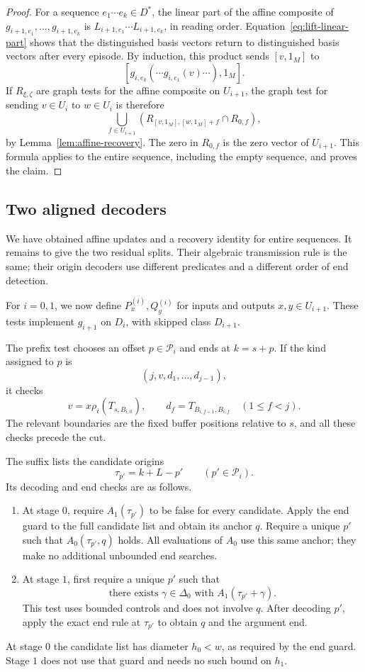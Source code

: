 \begin{proof}
For a sequence $e_1\cdots e_k\in D^*$, the linear part of the affine
composite of $g_{i+1,e_1},\ldots,g_{i+1,e_k}$ is
$L_{i+1,e_1}\cdots L_{i+1,e_k}$, in reading order.
Equation~\eqref{eq:lift-linear-part} shows that the distinguished basis
vectors return to distinguished basis vectors after every episode.
By induction, this product sends $[v,1_M]$ to
\[
 [g_{i,e_k}(\cdots g_{i,e_1}(v)\cdots),1_M].
\]
If $R_{\xi,\zeta}$ are graph tests for the affine composite on
$U_{i+1}$, the graph test for sending $v\in U_i$ to $w\in U_i$ is
therefore
\[
 \bigcup_{f\in U_{i+1}}
 \left(R_{[v,1_M],[w,1_M]+f}\cap R_{0,f}\right),
\]
by Lemma~\ref{lem:affine-recovery}.  The zero in $R_{0,f}$ is the
zero vector of $U_{i+1}$.  This formula applies to the entire sequence,
including the empty sequence, and proves the claim.
\end{proof}

\subsection{Two aligned decoders}

We have obtained affine updates and a recovery identity for entire
sequences. It remains to give the two residual splits. Their algebraic
transmission rule is the same; their origin decoders use different
predicates and a different order of end detection.

For $i=0,1$, we now define $P_x^{(i)},Q_y^{(i)}$ for inputs and outputs
$x,y\in U_{i+1}$.  These tests implement $g_{i+1}$ on $D_i$, with
skipped class $D_{i+1}$.

The prefix test chooses an offset $p\in\mathcal P_i$ and ends at
$k=s+p$.  If the kind assigned to $p$ is
\[
 (j,v,d_1,\ldots,d_{j-1}),
\]
it checks
\[
 v=x\rho_i(T_{s,B_{i,0}}),\qquad
 d_f=T_{B_{i,f-1},B_{i,f}}\quad(1\leq f<j).
\]
The relevant boundaries are the fixed buffer positions relative to
$s$, and all these checks precede the cut.

The suffix lists the candidate origins
\[
 \tau_{p'}=k+L-p'\qquad(p'\in\mathcal P_i).
\]
Its decoding and end checks are as follows.
\begin{enumerate}[label=\textup{(\arabic*)},leftmargin=*]
\item At stage $0$, require $A_1(\tau_{p'})$ to be false for every
candidate.  Apply the end guard to the full candidate list and obtain
its anchor $q$.  Require a unique $p'$ such that
$A_0(\tau_{p'},q)$ holds.  All evaluations of $A_0$ use this same
anchor; they make no additional unbounded end searches.
\item At stage $1$, first require a unique $p'$ such that
\[
 \text{there exists }\gamma\in\Delta_0
                  \text{ with }A_1(\tau_{p'}+\gamma).
\]
This test uses bounded controls and does not involve $q$.
After decoding $p'$, apply the exact end rule at $\tau_{p'}$ to
obtain $q$ and the argument end.
\end{enumerate}
At stage $0$ the candidate list has diameter $h_0<w$, as required
by the end guard.  Stage $1$ does not use that guard and needs no
such bound on $h_1$.

